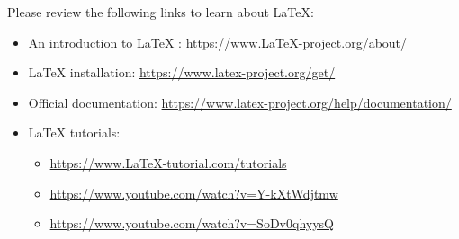 \documentclass[12pt,fleqn]{article}
\newcommand{\be}{\begin{enumerate}}
\newcommand{\ee}{\end{enumerate}}
\newcommand{\bi}{\begin{itemize}}
\newcommand{\ei}{\end{itemize}}
\begin{document}

%
%

Please review the following links to learn about LaTeX:

\bi
\item An introduction to LaTeX : \url{https://www.LaTeX-project.org/about/}
\item LaTeX installation: \url{https://www.latex-project.org/get/}
\item Official documentation: \url{https://www.latex-project.org/help/documentation/}
\item LaTeX  tutorials: 
	\bi
	\item \url{https://www.LaTeX-tutorial.com/tutorials}
	\item \url{https://www.youtube.com/watch?v=Y-kXtWdjtmw}
	\item \url{https://www.youtube.com/watch?v=SoDv0qhyysQ}
	\ei
\ei
\end{document}

